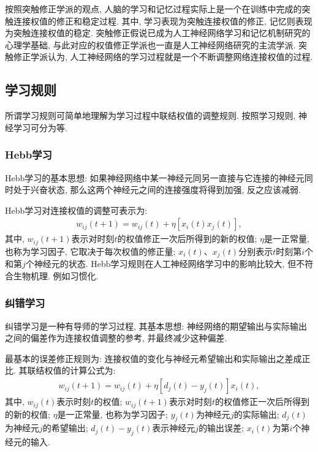 按照突触修正学派的观点, 人脑的学习和记忆过程实际上是一个在训练中完成的突触连接权值的修正和稳定过程. 其中, 学习表现为突触连接权值的修正, 记忆则表现为突触连接权值的稳定.
突触修正假说已成为人工神经网络学习和记忆机制研究的心理学基础, 与此对应的权值修正学派也一直是人工神经网络研究的主流学派.
突触修正学派认为, 人工神经网络的学习过程就是一个不断调整网络连接权值的过程.
\subsection{学习规则}
所谓学习规则可简单地理解为学习过程中联结权值的调整规则. 按照学习规则, 神经学习可分为等.
\subsubsection{Hebb学习}
Hebb学习的基本思想: 如果神经网络中某一神经元同另一直接与它连接的神经元同时处于兴奋状态, 那么这两个神经元之间的连接强度将得到加强, 反之应该减弱.

Hebb学习对连接权值的调整可表示为:
\begin{align}
    w_{i j} (t+1)=w_{i j} (t)+\eta\left[x_{i}(t) x_{j}(t)\right],
\end{align}
其中, $w_{ij} (t+1)$表示对时刻$t$的权值修正一次后所得到的新的权值; $\eta$是一正常量, 也称为学习因子, 它取决于每次权值的修正量;
$x_i (t)$、$x_j (t)$分别表示$t$时刻第$i$个和第$j$个神经元的状态.
Hebb学习规则在人工神经网络学习中的影响比较大, 但不符合生物机理. 例如习惯化.
\subsubsection{纠错学习}
纠错学习是一种有导师的学习过程, 其基本思想: 神经网络的期望输出与实际输出之间的偏差作为连接权值调整的参考, 并最终减少这种偏差.

最基本的误差修正规则为: 连接权值的变化与神经元希望输出和实际输出之差成正比. 其联结权值的计算公式为:
\begin{align}
    w_{i j} (t+1)=w_{i j} (t)+\eta\left[d_{j} (t)-y_{j} (t)\right] x_{i} (t),
\end{align}
其中, $w_{ij} (t)$表示时刻$t$的权值; $w_{ij} (t+1)$表示对时刻$t$的权值修正一次后所得到的新的权值; $\eta$是一正常量, 也称为学习因子; $y_j (t)$为神经元$j$的实际输出; $d_j (t)$为神经元$j$的希望输出; $d_j (t)-y_j (t)$表示神经元$j$的输出误差; $x_i (t)$为第$i$个神经元的输入.
